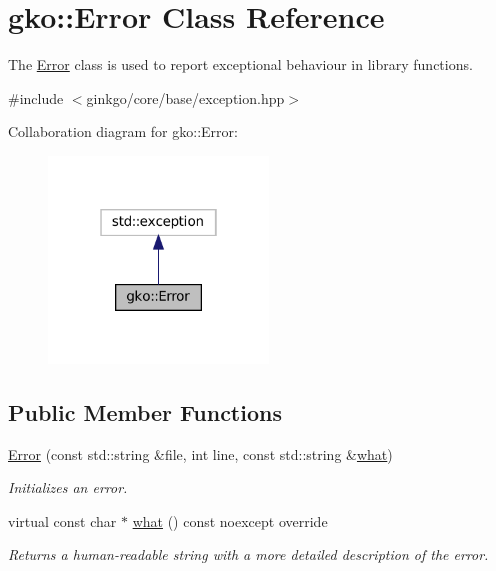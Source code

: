 \hypertarget{classgko_1_1Error}{}\section{gko\+:\+:Error Class Reference}
\label{classgko_1_1Error}


The \hyperlink{classgko_1_1Error}{Error} class is used to report exceptional behaviour in library functions.  




{\ttfamily \#include $<$ginkgo/core/base/exception.\+hpp$>$}



Collaboration diagram for gko\+:\+:Error\+:
\nopagebreak
\begin{figure}[H]
\begin{center}
\leavevmode
\includegraphics[width=166pt]{classgko_1_1Error__coll__graph}
\end{center}
\end{figure}
\subsection*{Public Member Functions}
\begin{DoxyCompactItemize}
\item 
\hyperlink{classgko_1_1Error_a750493241a840d96cafbf9c84cfd4f52}{Error} (const std\+::string \&file, int line, const std\+::string \&\hyperlink{classgko_1_1Error_a38cf4e9e4463088091a344f218c2dd8f}{what})
\begin{DoxyCompactList}\small\item\em Initializes an error. \end{DoxyCompactList}\item 
\mbox{\label{classgko_1_1Error_a38cf4e9e4463088091a344f218c2dd8f}} 
virtual const char $\ast$ \hyperlink{classgko_1_1Error_a38cf4e9e4463088091a344f218c2dd8f}{what} () const noexcept override
\begin{DoxyCompactList}\small\item\em Returns a human-\/readable string with a more detailed description of the error. \end{DoxyCompactList}\end{DoxyCompactItemize}



